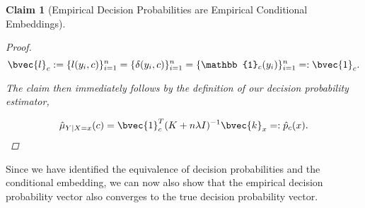 \documentclass{article}
\newtheorem{claim}[theorem]{Claim}
\begin{document}
\begin{claim}[Empirical Decision Probabilities are Empirical Conditional Embeddings]
\begin{proof}
			\begin{equation}
				\bvec{l}_{c} := \{l(y_{i}, c)\}_{i = 1}^{n} = \{\delta(y_{i}, c)\}_{i = 1}^{n} = \{\mathbb{1}_{c}(y_{i})\}_{i = 1}^{n} =: \bvec{1}_{c}.
			\end{equation}
			
			The claim then immediately follows by the definition of our decision probability estimator,
			
			\begin{equation}
				\hat{\mu}_{Y | X = x}(c) = \bvec{1}_{c}^{T} (K + n \lambda I)^{-1} \bvec{k}_{x} =: \hat{p}_{c}(x).
			\end{equation}
		\end{proof}
		
	\end{claim}
	
	Since we have identified the equivalence of decision probabilities and the conditional embedding, we can now also show that the empirical decision probability vector also converges to the true decision probability vector.
\end{document}
